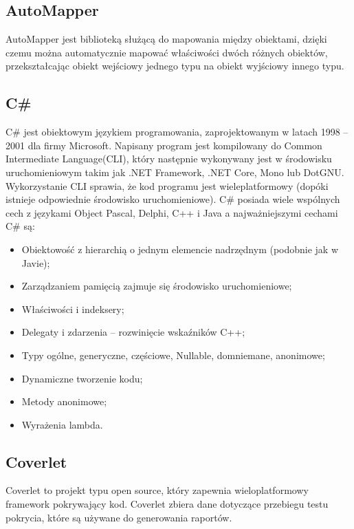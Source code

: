 \documentclass[12pt,a4paper]{article}
\begin{document}
		\subsection{AutoMapper}
			\indent AutoMapper jest biblioteką służącą do mapowania między obiektami, dzięki czemu można automatycznie mapować właściwości dwóch różnych obiektów,
					przekształcając obiekt wejściowy jednego typu na obiekt wyjściowy innego typu.  
		\subsection{C\#}
			\indent C\# jest obiektowym językiem programowania, zaprojektowanym w latach 1998 – 2001 dla firmy Microsoft.
			Napisany program jest kompilowany do Common Intermediate Language(CLI), który następnie wykonywany jest w środowisku uruchomieniowym takim jak .NET Framework,
			.NET Core, Mono lub DotGNU.
			Wykorzystanie CLI sprawia, że kod programu jest wieleplatformowy (dopóki istnieje odpowiednie środowisko uruchomieniowe).
			C\# posiada wiele wspólnych cech z językami Object Pascal, Delphi, C++ i Java a najważniejszymi cechami C\# są:
			\begin{itemize}
				\item Obiektowość z hierarchią o jednym elemencie nadrzędnym (podobnie jak w Javie);
				\item Zarządzaniem pamięcią zajmuje się środowisko uruchomieniowe;
				\item Właściwości i indeksery;
				\item Delegaty i zdarzenia – rozwinięcie wskaźników C++;
				\item Typy ogólne, generyczne, częściowe, Nullable, domniemane, anonimowe;
				\item Dynamiczne tworzenie kodu;
				\item Metody anonimowe;
				\item Wyrażenia lambda.
			\end{itemize}
		
		\subsection{Coverlet}
			\indent Coverlet to projekt typu open source, który zapewnia wieloplatformowy framework
			pokrywający kod. Coverlet zbiera dane dotyczące przebiegu testu pokrycia,
			które są używane do generowania raportów.
		
\end{document}
